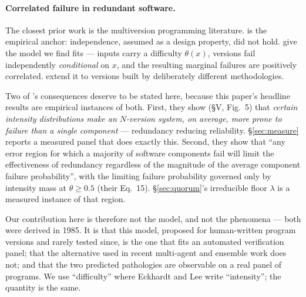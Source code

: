 \documentclass[11pt,a4paper]{article}
\begin{document}
\paragraph{Correlated failure in redundant software.}
The closest prior work is the multiversion programming literature.
\citet{knight1986} is the empirical anchor: independence, assumed as a design
property, did not hold. \citet{eckhardt1985} give the model we find fits ---
inputs carry a difficulty $\theta(x)$, versions fail independently
\emph{conditional} on $x$, and the resulting marginal failures are positively
correlated. \citet{littlewood1989} extend it to versions built by deliberately
different methodologies.

Two of \citet{eckhardt1985}'s consequences deserve to be stated here, because
this paper's headline results are empirical instances of both. First, they show
(\S V, Fig.~5) that \emph{certain intensity distributions make an $N$-version
system, on average, more prone to failure than a single component} --- redundancy
reducing reliability. \S\ref{sec:measure} reports a measured panel that does
exactly this. Second, they show that ``any error region for which a majority of
software components fail will limit the effectiveness of redundancy regardless of
the magnitude of the average component failure probability'', with the limiting
failure probability governed only by intensity mass at $\theta \geq 0.5$
(their Eq.~15). \S\ref{sec:quorum}'s irreducible floor $\lambda$ is a measured
instance of that region.

Our contribution here is therefore not the model, and not the phenomena --- both
were derived in 1985. It is that this model, proposed for human-written program
versions and rarely tested since, is the one that fits an automated verification
panel; that the alternative used in recent multi-agent and ensemble work does
not; and that the two predicted pathologies are observable on a real panel of
programs. We use ``difficulty'' where Eckhardt and Lee write ``intensity''; the
quantity is the same.
\end{document}
